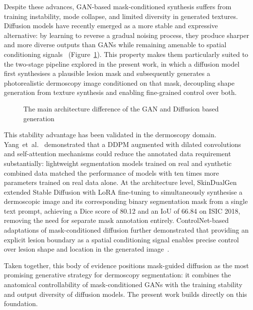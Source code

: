 Despite these advances, GAN-based mask-conditioned synthesis
suffers from training instability, mode collapse, and limited
diversity in generated textures.
Diffusion models have recently emerged as a more stable and
expressive alternative: by learning to reverse a gradual noising
process, they produce sharper and more diverse outputs than GANs
while remaining amenable to spatial conditioning
signals~\cite{ho2020denoising} (Figure~\ref{fig:gan_vs_diffusion}).
This property makes them particularly suited to the two-stage
pipeline explored in the present work, in which a diffusion model
first synthesises a plausible lesion mask and subsequently generates
a photorealistic dermoscopy image conditioned on that mask,
decoupling shape generation from texture synthesis and enabling
fine-grained control over both.

\begin{figure}[H]
    \centering
    \caption{The main architecture difference of the GAN and Diffusion based generation}
    \label{fig:gan_vs_diffusion}
\end{figure}

This stability advantage has been validated in the dermoscopy domain.
Yang~et~al.~\cite{yang2025better} demonstrated that a DDPM augmented
with dilated convolutions and self-attention mechanisms could reduce
the annotated data requirement substantially: lightweight segmentation
models trained on real and synthetic combined data matched the
performance of models with ten times more parameters trained on real
data alone.
At the architecture level, SkinDualGen~\cite{xu2025skindualgen}
extended Stable Diffusion with LoRA fine-tuning to simultaneously
synthesise a dermoscopic image and its corresponding binary
segmentation mask from a single text prompt, achieving a Dice score
of 80.12 and an IoU of 66.84 on ISIC 2018, removing the need for
separate mask annotation entirely.
ControlNet-based adaptations of mask-conditioned diffusion further
demonstrated that providing an explicit lesion boundary as a spatial
conditioning signal enables precise control over lesion shape and
location in the generated image~\cite{du2024boosting}.

Taken together, this body of evidence positions mask-guided diffusion
as the most promising generative strategy for dermoscopy segmentation:
it combines the anatomical controllability of mask-conditioned GANs
with the training stability and output diversity of diffusion models.
The present work builds directly on this foundation.


